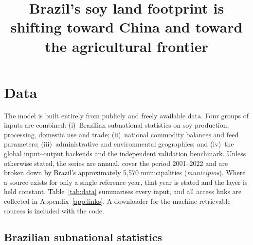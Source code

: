\documentclass[pdflatex,sn-nature]{sn-jnl}%
\begin{document}
\title[Brazil's shifting soy land footprint]{Brazil's soy land footprint
is shifting toward China and toward the agricultural frontier}

\author*[1]{ }




\maketitle

\section{Data}\label{sec:data}

The model is built entirely from publicly and freely available data. Four
groups of inputs are combined: (i)~Brazilian subnational statistics on soy
production, processing, domestic use and trade; (ii)~national commodity
balances and feed parameters; (iii)~administrative and environmental
geographies; and (iv)~the global input--output backends and the independent
validation benchmark. Unless otherwise stated, the series are annual, cover the period 2001–2022 and are broken down by Brazil's approximately 5,570 municipalities
(\emph{munic\'ipios}). Where a source exists for only a single reference
year, that year is stated and the layer is held constant.
Table~\ref{tab:data} summarises every input, and all access links are collected
in Appendix~\ref{app:links}. A downloader for the machine-retrievable
sources is included with the code.

\subsection{Brazilian subnational statistics}\label{subsec:brazil}
\end{document}
